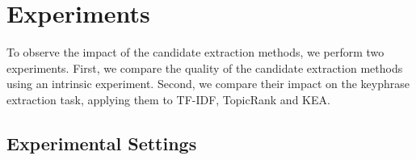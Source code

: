 \section{Experiments}
\label{sec:evaluation}
  To observe the impact of the candidate extraction methods, we perform two
  experiments. First, we compare the quality of the candidate extraction methods
  using an intrinsic experiment. Second, we compare their impact on the
  keyphrase extraction task, applying them to TF-IDF, TopicRank and KEA.

  \subsection{Experimental Settings}
  \label{subsec:evaluation_settings}

